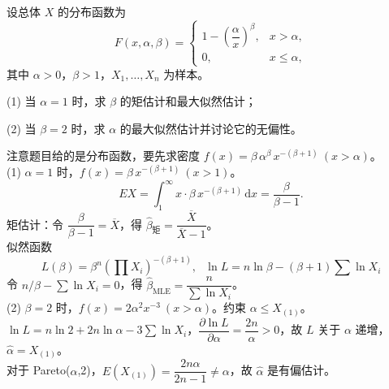 \documentclass[lang=cn,11pt]{elegantbook}
\begin{document}
\begin{exercise}\label{exer:7-pareto}\label{exer:src-2015-spring-a-07}
设总体 \(X\) 的分布函数为
\[
F(x,\alpha,\beta) = \begin{cases} 1-\left(\dfrac{\alpha}{x}\right)^{\!\beta}, & x > \alpha, \\ 0, & x \leq \alpha, \end{cases}
\]
其中 \(\alpha > 0\)，\(\beta > 1\)，\(X_1, \dots, X_n\) 为样本。\par
(1) 当 \(\alpha=1\) 时，求 \(\beta\) 的矩估计和最大似然估计；\par
(2) 当 \(\beta=2\) 时，求 \(\alpha\) 的最大似然估计并讨论它的无偏性。
\end{exercise}
\begin{solution}
注意题目给的是分布函数，要先求密度 \(f(x) = \beta\,\alpha^\beta\,x^{-(\beta+1)}\ (x > \alpha)\)。\\
(1) \(\alpha=1\) 时，\(f(x) = \beta\,x^{-(\beta+1)}\ (x > 1)\)。
\[
EX = \int_1^\infty x\cdot\beta\,x^{-(\beta+1)}\,\mathrm{d}x = \frac{\beta}{\beta-1}.
\]
矩估计：令 \(\dfrac{\beta}{\beta-1} = \overline{X}\)，得 \(\hat{\beta}_{\text{矩}} = \dfrac{\overline{X}}{\overline{X}-1}\)。\\
似然函数 \[L(\beta) = \beta^n\!\left(\prod X_i\right)^{-(\beta+1)},~~~\ln L = n\ln\beta - (\beta+1)\sum\ln X_i\]
令 \(n/\beta - \sum\ln X_i = 0\)，得 \(\hat{\beta}_{\text{MLE}} = \dfrac{n}{\sum\ln X_i}\)。\\
(2) \(\beta=2\) 时，\(f(x) = 2\alpha^2 x^{-3}\ (x > \alpha)\)。约束 \(\alpha \leq X_{(1)}\)。\\
\(\ln L = n\ln 2 + 2n\ln\alpha - 3\sum\ln X_i\)，\(\dfrac{\partial\ln L}{\partial\alpha} = \dfrac{2n}{\alpha} > 0\)，故 \(L\) 关于 \(\alpha\) 递增，\(\hat{\alpha} = X_{(1)}\)。\\
对于 Pareto(\(\alpha\),2)，\(E(X_{(1)}) = \dfrac{2n\alpha}{2n-1} \neq \alpha\)，故 \(\hat{\alpha}\) 是有偏估计。
\end{solution}
\end{document}
